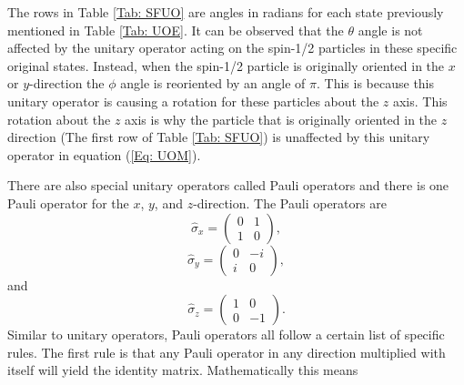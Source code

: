 \documentclass[twocolumn]{article}
\begin{document}
\par \noindent
The rows in Table \ref{Tab: SFUO} are angles in radians for each state previously mentioned in Table \ref{Tab: UOE}. It can be observed that the $\theta$ angle is not affected by the unitary operator acting on the spin-1/2 particles in these specific original states. Instead, when the spin-1/2 particle is originally oriented in the $x$ or $y$-direction the $\phi$ angle is reoriented by an angle of $\pi$. This is because this unitary operator is causing a rotation for these particles about the $z$ axis. This rotation about the $z$ axis is why the particle that is originally oriented in the $z$ direction (The first row of Table \ref{Tab: SFUO}) is unaffected by this unitary operator in equation (\ref{Eq: UOM}).

There are also special unitary operators called Pauli operators and there is one Pauli operator for the $x$, $y$, and $z$-direction. The Pauli operators are
\begin{equation}\label{Eq: POX}
\hat{\sigma}_x=
\begin{pmatrix}
0 & 1 \\
1 & 0
\end{pmatrix},
\end{equation}
\begin{equation}\label{Eq: POY}
\hat{\sigma}_y=
\begin{pmatrix}
0 & -i \\
i & 0
\end{pmatrix},
\end{equation}
and
\begin{equation}\label{Eq: POZ}
\hat{\sigma}_z=
\begin{pmatrix}
1 & 0 \\
0 & -1
\end{pmatrix}.
\end{equation}
Similar to unitary operators, Pauli operators all follow a certain list of specific rules. The first rule is that any Pauli operator in any direction multiplied with itself will yield the identity matrix. Mathematically this means
\end{document}
